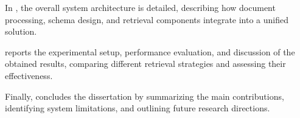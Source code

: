 In , the overall system architecture is detailed, describing how document processing, schema design, and retrieval components integrate into a unified solution.

 reports the experimental setup, performance evaluation, and discussion of the obtained results, comparing different retrieval strategies and assessing their effectiveness. 

Finally,  concludes the dissertation by summarizing the main contributions, identifying system limitations, and outlining future research directions.
